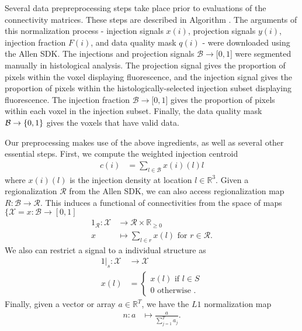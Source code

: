 Several data prepreprocessing steps take place prior to evaluations of the connectivity matrices.
These steps are described in Algorithm \pre.
The arguments of this normalization process - injection signals $x(i)$, projection signals $y(i)$, injection fraction $F(i)$, and data quality mask $q(i)$ - were downloaded using the Allen SDK. %
The injections and projection signals $ \mathcal B \to \mathbb [0,1]$ were segmented manually in histological analysis.
The projection signal gives the proportion of pixels within the voxel displaying fluorescence, and the injection signal gives the proportion of pixels within the histologically-selected injection subset displaying fluorescence.
The injection fraction $ \mathcal B \to \mathbb [0,1]$ gives the proportion of pixels within each voxel in the injection subset.
Finally, the data quality mask $ \mathcal B \to \mathbb \{0,1\}$ gives the voxels that have valid data.

Our preprocessing makes use of the above ingredients, as well as several other essential steps.
First, we compute the weighted injection centroid
\begin{eqnarray*}
c(i) &= \sum_{l \in \mathcal B} x(i)(l) l
\end{eqnarray*}
where $x(i)(l)$ is the injection density at location $l \in \mathbb R^3$.
Given a regionalization $\mathcal R$ from the Allen SDK, we can also access regionalization map $R: \mathcal B  \to \mathcal R $.
This induces a functional of connectivities from the space of maps $\{\mathcal X = x: \mathcal B \to [0,1]$
\begin{eqnarray*}
1_{\mathcal R}: \mathcal X &\to \mathcal R \times \mathbb R_{\geq 0} \\
x &\mapsto \sum_{l \in r}  x(l)  \text{ for } r \in \mathcal R.
\end{eqnarray*}
We also can restrict a signal to a individual structure as
\begin{eqnarray*}
1 |_s :  \mathcal X &\to  \mathcal X \\
 x(l) &= \begin{cases} 
 x(l) \text{ if } l \in S \\
 0 \text{ otherwise }.
 \end{cases}
\end{eqnarray*}
Finally, given a vector or array $a \in \mathbb R^T$, we have the $L1$ normalization map
\begin{eqnarray*}
n: a &\mapsto \frac{a}{\sum_{j = 1}^T a_j}.
\end{eqnarray*}

